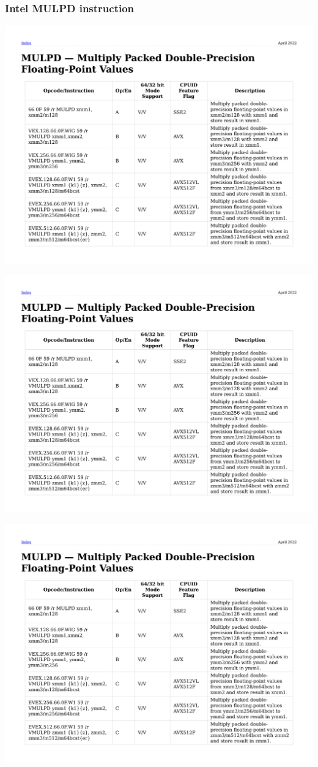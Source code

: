 \documentclass{beamer}
\begin{document}
\begin{frame}[fragile]
\frametitle{Intel MULPD instruction}
\includegraphics[page=1, clip, trim=0in 3.2in 0in 0.75in, width=\textwidth]{mulpd.pdf}

\includegraphics[page=2, clip, trim=0in 5in 0in 2.2in, width=\textwidth]{mulpd.pdf}

\includegraphics[page=3, clip, trim=0in 2.6in 0in 4.2in, width=\textwidth]{mulpd.pdf}
\end{frame}
\end{document}
